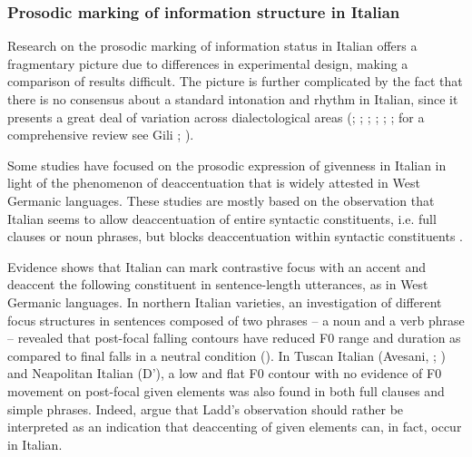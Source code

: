 \subsubsection{Prosodic marking of information structure in Italian}
\hypertarget{Toc191305887}{}
Research on the prosodic marking of information status in Italian offers a fragmentary picture due to differences in experimental design, making a comparison of results difficult. The picture is further complicated by the fact that there is no consensus about a standard intonation and rhythm in Italian, since it presents a great deal of variation across dialectological areas (\citealt{BertinettoLoporcaro2005}; \citealt{Canepari1980}; \citealt{Giordano2006}; \citealt{LepschyLepschy1977}; \citealt{Magno-CaldognettoEtAl1978}; \citealt{Savino2012}; for a comprehensive review see Gili \citealt{FivelaEtAl2015}; \citealt{Vietti2019}). 

Some studies have focused on the prosodic expression of givenness in Italian in light of the phenomenon of deaccentuation that is widely attested in West Germanic languages. These studies are mostly based on the observation that Italian seems to allow deaccentuation of entire syntactic constituents, i.e. full clauses or noun phrases, but blocks deaccentuation within syntactic constituents \citep{Ladd1996}.

Evidence shows that Italian can mark contrastive focus with an accent and deaccent the following constituent in sentence-length utterances, as in West Germanic languages. In northern Italian varieties, an investigation of different focus structures in sentences composed of two phrases – a noun and a verb phrase – revealed that post-focal falling contours have reduced F0 range and duration as compared to final falls in a neutral condition (\citealt{FarnetaniZmarich1997}). In Tuscan Italian (Avesani, \citealt{HirschbergPrieto1995}; \citealt{HirschbergAvesani1997}) and Neapolitan Italian (D’\citealt{ImperioHouse1997}), a low and flat F0 contour with no evidence of F0 movement on post-focal given elements was also found in both full clauses and simple phrases. Indeed, \citet{AvesaniEtAl2015} argue that Ladd’s observation should rather be interpreted as an indication that deaccenting of given elements can, in fact, occur in Italian. 

